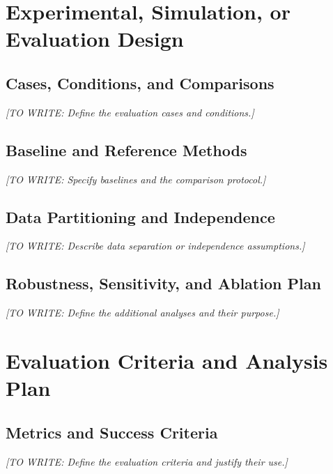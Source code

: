 \documentclass[12pt,a4paper,oneside]{report}
\newif\ifshowguidance
\newcommand{\Guide}[1]{%
  \ifshowguidance
  \begin{tcolorbox}[enhanced,breakable,colback=GuideBlue,
    colframe=GuideBorder,boxrule=0.5pt,arc=1mm,
    title={Writing guide --- replace with your research},
    colbacktitle=ThesisBlue,coltitle=white,fonttitle=\small\bfseries,
    before skip=10pt,after skip=10pt]
    \small #1
  \end{tcolorbox}
  \fi}
\newcommand{\Draft}[1]{\par\noindent\textit{[TO WRITE: #1]}\par}
\begin{document}
\section{Experimental, Simulation, or Evaluation Design}
\subsection{Cases, Conditions, and Comparisons}
\Guide{List the experimental conditions, simulation cases, or comparison
groups. Explain controls, randomization, blinding, repeated measures, or
parameter sweeps where relevant. State what is held constant.}
\Draft{Define the evaluation cases and conditions.}
\subsection{Baseline and Reference Methods}
\Guide{Select credible baselines, including a simple baseline if useful.
Describe their implementation and tuning. Use comparable inputs, data,
budgets, and evaluation rules, or explain unavoidable differences.}
\Draft{Specify baselines and the comparison protocol.}
\subsection{Data Partitioning and Independence}
\Guide{For predictive work, describe train/validation/test splits and
whether separation is by participant, time, location, or system. Prevent
related observations from leaking across partitions. If no data partition
is needed, explain independence or repeated-use considerations and rename
this subsection accordingly.}
\Draft{Describe data separation or independence assumptions.}
\subsection{Robustness, Sensitivity, and Ablation Plan}
\Guide{State how you vary uncertain inputs or important design choices.
For a multicomponent method, ablations isolate a component's contribution.
Use justified ranges and repeated runs where needed; do not add ablations
when there are no separable components.}
\Draft{Define the additional analyses and their purpose.}

\section{Evaluation Criteria and Analysis Plan}
\subsection{Metrics and Success Criteria}
\Guide{Define every metric, units, aggregation, direction of improvement,
and limitations. Explain why it answers the question. State pre-specified
success criteria if there were any; label criteria chosen after inspecting
results as retrospective.}
\Draft{Define the evaluation criteria and justify their use.}
\end{document}
